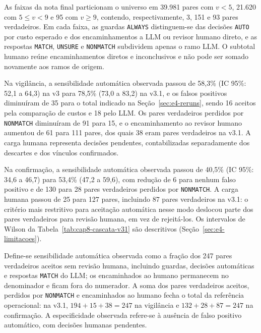 As faixas da nota final particionam o universo em 39.981 pares com $v<5$, 21.620 com $5\leq v<9$ e 95 com $v\geq9$, contendo, respectivamente, 3, 151 e 93 pares verdadeiros. Em cada faixa, as guardas \texttt{ALWAYS} distinguem-se das decisões \texttt{AUTO} por custo esperado e dos encaminhamentos a LLM ou revisor humano direto, e as respostas \texttt{MATCH}, \texttt{UNSURE} e \texttt{NONMATCH} subdividem apenas o ramo LLM. O subtotal humano reúne encaminhamentos diretos e inconclusivos e não pode ser somado novamente aos ramos de origem.

Na vigilância, a sensibilidade automática observada passou de 58,3\% (IC 95\%: 52,1 a 64,3) na v3 para 78,5\% (73,0 a 83,2) na v3.1, e os falsos positivos diminuíram de 35 para o total indicado na Seção~\ref{sec:e4-reruns}, sendo 16 aceitos pela comparação de custos e 18 pelo LLM. Os pares verdadeiros perdidos por \texttt{NONMATCH} diminuíram de 91 para 15, e o encaminhamento ao revisor humano aumentou de 61 para 111 pares, dos quais 38 eram pares verdadeiros na v3.1. A carga humana representa decisões pendentes, contabilizadas separadamente dos descartes e dos vínculos confirmados.

Na confirmação, a sensibilidade automática observada passou de 40,5\% (IC 95\%: 34,6 a 46,7) para 53,4\% (47,2 a 59,6), com redução de 6 para nenhum falso positivo e de 130 para 28 pares verdadeiros perdidos por \texttt{NONMATCH}. A carga humana passou de 25 para 127 pares, incluindo 87 pares verdadeiros na v3.1: o critério mais restritivo para aceitação automática nesse modo deslocou parte dos pares verdadeiros para revisão humana, em vez de rejeitá-los. Os intervalos de Wilson da Tabela~\ref{tab:cap8-cascata-v31} são descritivos (Seção~\ref{sec:e4-limitacoes}).

Define-se sensibilidade automática observada como a fração dos 247 pares verdadeiros aceitos sem revisão humana, incluindo guardas, decisões automáticas e respostas \texttt{MATCH} do LLM; os encaminhados ao humano permanecem no denominador e ficam fora do numerador. A soma dos pares verdadeiros aceitos, perdidos por \texttt{NONMATCH} e encaminhados ao humano fecha o total da referência operacional: na v3.1, $194+15+38=247$ na vigilância e $132+28+87=247$ na confirmação. A especificidade observada refere-se à ausência de falso positivo automático, com decisões humanas pendentes.

